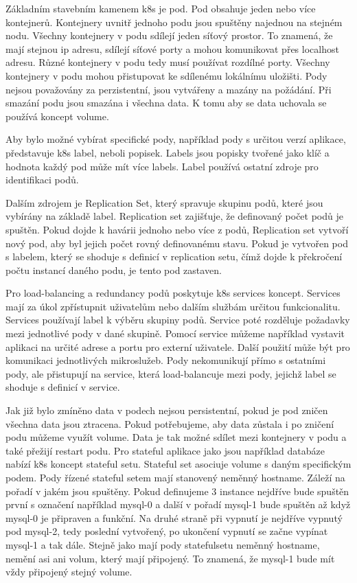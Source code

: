 Základním stavebním kamenem k8s je pod. Pod obsahuje jeden nebo více \linebreak kontejnerů. Kontejnery uvnitř jednoho podu jsou spuštěny najednou na stejném nodu. \linebreak Všechny kontejnery v podu sdílejí jeden síťový prostor. To znamená, že mají stejnou ip adresu, sdílejí síťové porty a mohou komunikovat přes localhost adresu. Různé kontejnery v podu tedy musí používat rozdílné porty. Všechny kontejnery v podu mohou přistupovat ke sdílenému lokálnímu uložišti. Pody nejsou považovány za perzistentní, jsou vytvářeny a mazány na požádání. Při smazání podu jsou smazána i všechna data. K tomu aby se data uchovala se používá koncept volume.\par
Aby bylo možné vybírat specifické pody, například pody s určitou verzí aplikace, představuje k8s label, neboli popisek. Labels jsou popisky tvořené jako klíč a hodnota každý pod může mít více labels. Label používá ostatní zdroje pro identifikaci podů.\par
Dalším zdrojem je Replication Set, který spravuje skupinu podů, které jsou vybírány na základě label. Replication set zajišťuje, že definovaný počet podů je spuštěn. Pokud dojde k havárii jednoho nebo více z podů, Replication set vytvoří nový pod, aby byl jejich počet rovný definovanému stavu. Pokud je vytvořen pod s labelem, který se shoduje s definicí v replication setu, čímž dojde k překročení počtu instancí daného podu, je tento pod zastaven. \par
Pro load-balancing a redundancy podů poskytuje k8s services koncept. Services mají za úkol zpřístupnit uživatelům nebo dalším službám určitou funkcionalitu. Services používají label k výběru skupiny podů. Service poté rozděluje požadavky mezi jednotlivé pody v dané skupině. Pomocí service můžeme například vystavit aplikaci na určité adrese a portu pro externí uživatele. Další použití může být pro komunikaci jednotlivých mikroslužeb. Pody nekomunikují přímo s ostatními pody, ale přistupují na service, která load-balancuje mezi pody, jejichž label se shoduje s definicí v service.\par
Jak již bylo zmíněno data v podech nejsou persistentní, pokud je pod zničen všechna data jsou ztracena. Pokud potřebujeme, aby data zůstala i po zničení podu můžeme využít volume. Data je tak možné sdílet mezi kontejnery v podu a také přežijí restart podu. Pro stateful aplikace jako jsou například databáze nabízí k8s koncept stateful setu. Stateful set asociuje volume s daným specifickým podem. Pody řízené stateful setem mají stanovený neměnný hostname. Záleží na pořadí v jakém jsou spuštěny. Pokud definujeme 3 instance nejdříve bude spuštěn první s označení například \linebreak mysql-0 a další v pořadí mysql-1 bude spuštěn až když mysql-0 je připraven a funkční. Na druhé straně při vypnutí je nejdříve vypnutý pod mysql-2, tedy poslední vytvořený, po ukončení vypnutí se začne vypínat mysql-1 a tak dále. Stejně jako mají pody statefulsetu neměnný hostname, nemění asi ani volum, který mají připojený. To znamená, že mysql-1 bude mít vždy připojený stejný volume.\par
